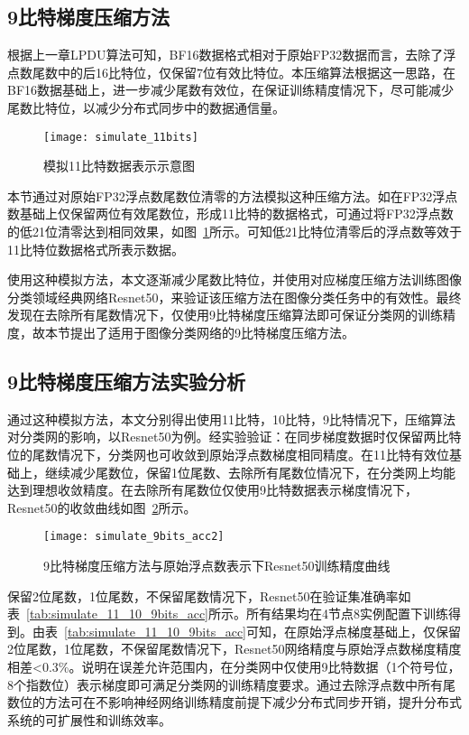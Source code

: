 \subsection{9比特梯度压缩方法}
根据上一章LPDU算法可知，BF16数据格式相对于原始FP32数据而言，去除了浮点数尾数中的后16比特位，仅保留7位有效比特位。本压缩算法根据这一思路，在BF16数据基础上，进一步减少尾数有效位，在保证训练精度情况下，尽可能减少尾数比特位，以减少分布式同步中的数据通信量。
\begin{figure}[htp]
\centering
\texttt{[image: simulate\_11bits]}
\caption{模拟11比特数据表示示意图}
\label{fig:simulate_11bits}
\end{figure}

本节通过对原始FP32浮点数尾数位清零的方法模拟这种压缩方法。如在FP32浮点数基础上仅保留两位有效尾数位，形成11比特的数据格式，可通过将FP32浮点数的低21位清零达到相同效果，如图~\ref{fig:simulate_11bits}所示。可知低21比特位清零后的浮点数等效于11比特位数据格式所表示数据。

使用这种模拟方法，本文逐渐减少尾数比特位，并使用对应梯度压缩方法训练图像分类领域经典网络Resnet50，来验证该压缩方法在图像分类任务中的有效性。最终发现在去除所有尾数情况下，仅使用9比特梯度压缩算法即可保证分类网的训练精度，故本节提出了适用于图像分类网络的9比特梯度压缩方法。

\subsection{9比特梯度压缩方法实验分析}
通过这种模拟方法，本文分别得出使用11比特，10比特，9比特情况下，压缩算法对分类网的影响，以Resnet50为例。经实验验证：在同步梯度数据时仅保留两比特位的尾数情况下，分类网也可收敛到原始浮点数梯度相同精度。在11比特有效位基础上，继续减少尾数位，保留1位尾数、去除所有尾数位情况下，在分类网上均能达到理想收敛精度。在去除所有尾数位仅使用9比特数据表示梯度情况下，Resnet50的收敛曲线如图~\ref{fig:simulate_9bits_acc}所示。

\begin{figure}[htp]
\centering
\texttt{[image: simulate\_9bits\_acc2]}
\caption{9比特梯度压缩方法与原始浮点数表示下Resnet50训练精度曲线}
\label{fig:simulate_9bits_acc}
\end{figure}

保留2位尾数，1位尾数，不保留尾数情况下，Resnet50在验证集准确率如表~\ref{tab:simulate_11_10_9bits_acc}所示。所有结果均在4节点8实例配置下训练得到。由表~\ref{tab:simulate_11_10_9bits_acc}可知，在原始浮点梯度基础上，仅保留2位尾数，1位尾数，不保留尾数情况下，Resnet50网络精度与原始浮点数梯度精度相差<0.3\%。说明在误差允许范围内，在分类网中仅使用9比特数据（1个符号位，8个指数位）表示梯度即可满足分类网的训练精度要求。通过去除浮点数中所有尾数位的方法可在不影响神经网络训练精度前提下减少分布式同步开销，提升分布式系统的可扩展性和训练效率。

